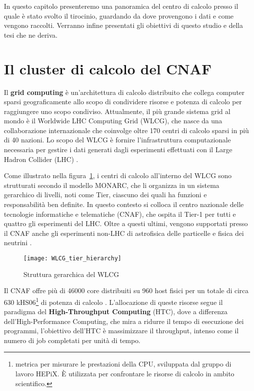 In questo capitolo presenteremo una panoramica del centro di calcolo presso il
quale è stato svolto il tirocinio, guardando da dove provengono i dati e come
vengono raccolti. Verranno infine presentati gli obiettivi di questo studio e
della tesi che ne deriva.

\section{Il cluster di calcolo del CNAF}

Il \textbf{grid computing} è un'architettura di calcolo distribuito che
collega computer sparsi geograficamente allo scopo di condividere risorse e
potenza di calcolo per raggiungere uno scopo condiviso. Attualmente, il più
grande sistema grid al mondo è il Worldwide LHC Computing Grid (WLCG), che
nasce da una collaborazione internazionale che coinvolge oltre 170 centri di
calcolo sparsi in più di 40 nazioni. Lo scopo del WLCG è fornire
l'infrastruttura computazionale necessaria per gestire i dati generati dagli
esperimenti effettuati con il Large Hadron Collider (LHC) \cite{WLCG2023}.

Come illustrato nella figura~\ref{fig:WLCG_tier_hierarchy}, i centri di
calcolo all'interno del WLCG sono strutturati secondo il modello MONARC, che
li organizza in un sistema gerarchico di livelli, noti come Tier, ciascuno dei
quali ha funzioni e responsabilità ben definite. In questo contesto si colloca
il centro nazionale delle tecnologie informatiche e telematiche (CNAF), che
ospita il Tier-1 per tutti e quattro gli esperimenti del LHC. Oltre a questi
ultimi, vengono supportati presso il CNAF anche gli esperimenti non-LHC di
astrofisica delle particelle e fisica dei neutrini \cite{Bortolotti2012}.

\begin{figure}[ht]
    \centering
    \texttt{[image: WLCG\_tier\_hierarchy]}
    \caption{Struttura gerarchica del WLCG \protect\cite{dalpra2019}}
    \label{fig:WLCG_tier_hierarchy}
\end{figure}

Il CNAF offre più di 46000 core distribuiti su 960 host fisici per un totale
di circa $630$ kHS06\footnote{metrica per misurare le prestazioni della CPU,
sviluppata dal gruppo di lavoro HEPiX. È utilizzata per confrontare le risorse
di calcolo in ambito scientifico.} di potenza di calcolo \cite{hepix2022}.
L'allocazione di queste risorse segue il paradigma del \textbf{High-Throughput
Computing} (HTC), dove a differenza dell'High-Performance Computing, che mira
a ridurre il tempo di esecuzione dei programmi, l'obiettivo dell'HTC è
massimizzare il throughput, intenso come il numero di job completati per unità
di tempo.

